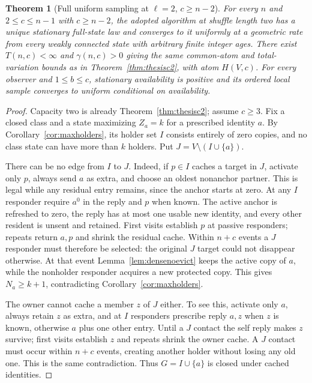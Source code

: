 \documentclass[11pt]{article}
\newtheorem{theorem}{Theorem}
\begin{document}
\begin{theorem}[Full uniform sampling at $\ell=2$, $c\ge n-2$]
\label{thm:thesisdense}
For every $n$ and $2\le c\le n-1$ with $c\ge n-2$,
the adopted algorithm at shuffle length two has a
unique stationary full-state law and converges to it
uniformly at a geometric rate from every weakly connected
state with arbitrary finite integer ages.
There exist $T(n,c)<\infty$ and $\gamma(n,c)>0$ giving
the same common-atom and total-variation bounds as in
Theorem~\ref{thm:thesisc2}, with atom $H(V,c)$.
For every observer and $1\le b\le c$, stationary
availability is positive and its ordered local sample
converges to uniform conditional on availability.
\end{theorem}
\begin{proof}
Capacity two is already Theorem~\ref{thm:thesisc2};
assume $c\ge3$. Fix a closed class and a state maximizing
$Z_a=k$ for a prescribed identity $a$.
By Corollary~\ref{cor:maxholders}, its holder set $I$
consists entirely of zero copies, and no class state
can have more than $k$ holders. Put
$J=V\setminus(I\cup\{a\})$.

There can be no edge from $I$ to $J$.
Indeed, if $p\in I$ caches a target in $J$, activate
only $p$, always send $a$ as extra, and choose an
oldest nonanchor partner. This is legal while any
residual entry remains, since the anchor starts at zero.
At any $I$ responder require $a^0$ in the reply and
$p$ when known. The active anchor is refreshed to zero,
the reply has at most one usable new identity, and
every other resident is unsent and retained.
First visits establish $p$ at passive responders;
repeats return $a,p$ and shrink the residual cache.
Within $n+c$ events a $J$ responder must therefore be
selected: the original $J$ target could not disappear
otherwise. At that event Lemma~\ref{lem:densenoevict}
keeps the active copy of $a$, while the nonholder
responder acquires a new protected copy. This gives
$N_a\ge k+1$, contradicting Corollary~\ref{cor:maxholders}.

The owner cannot cache a member $z$ of $J$ either.
To see this, activate only $a$, always retain $z$ as
extra, and at $I$ responders prescribe reply $a,z$
when $z$ is known, otherwise $a$ plus one other entry.
Until a $J$ contact the self reply makes $z$ survive;
first visits establish $z$ and repeats shrink the
owner cache. A $J$ contact must occur within $n+c$
events, creating another holder without losing any
old one. This is the same contradiction.
Thus $G=I\cup\{a\}$ is closed under cached identities.


\end{proof}
\end{document}
